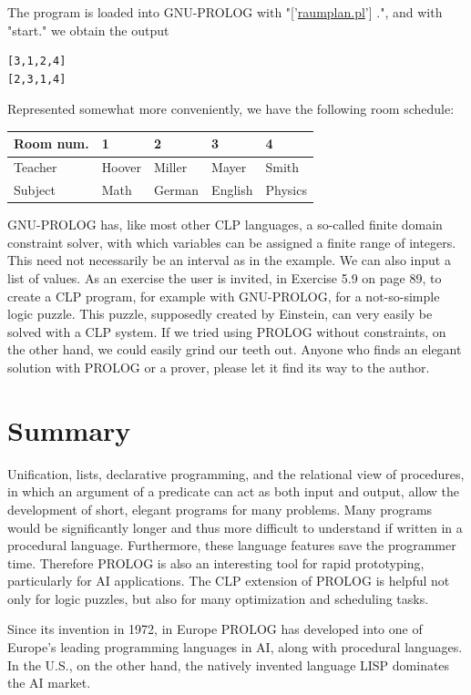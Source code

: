 \documentclass[10pt]{book}
\begin{document}
The program is loaded into GNU-PROLOG with "['\href{http://raumplan.pl}{raumplan.pl}'] .", and with "start." we obtain the output

\begin{verbatim}
[3,1,2,4]
[2,3,1,4]
\end{verbatim}

Represented somewhat more conveniently, we have the following room schedule:

\begin{center}
\begin{tabular}{lllll}
\hline
Room num. & 1 & 2 & 3 & 4 \\
\hline
Teacher & Hoover & Miller & Mayer & Smith \\
\hline
Subject & Math & German & English & Physics \\
\hline
\end{tabular}
\end{center}

GNU-PROLOG has, like most other CLP languages, a so-called finite domain constraint solver, with which variables can be assigned a finite range of integers. This need not necessarily be an interval as in the example. We can also input a list of values. As an exercise the user is invited, in Exercise 5.9 on page 89, to create a CLP program, for example with GNU-PROLOG, for a not-so-simple logic puzzle. This puzzle, supposedly created by Einstein, can very easily be solved with a CLP system. If we tried using PROLOG without constraints, on the other hand, we could easily grind our teeth out. Anyone who finds an elegant solution with PROLOG or a prover, please let it find its way to the author.

\section{Summary}
Unification, lists, declarative programming, and the relational view of procedures, in which an argument of a predicate can act as both input and output, allow the development of short, elegant programs for many problems. Many programs would be significantly longer and thus more difficult to understand if written in a procedural language. Furthermore, these language features save the programmer time. Therefore PROLOG is also an interesting tool for rapid prototyping, particularly for AI applications. The CLP extension of PROLOG is helpful not only for logic puzzles, but also for many optimization and scheduling tasks.

Since its invention in 1972, in Europe PROLOG has developed into one of Europe's leading programming languages in AI, along with procedural languages. In the U.S., on the other hand, the natively invented language LISP dominates the AI market.
\end{document}
